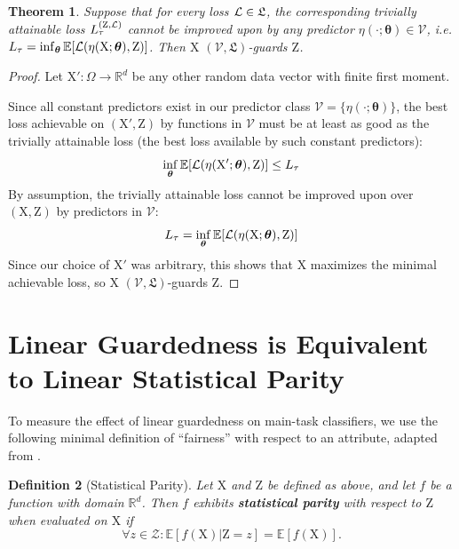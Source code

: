 \documentclass{article}
\theoremstyle{plain}
\newtheorem{theorem}{Theorem}[section]
\newtheorem{definition}[theorem]{Definition}
\theoremstyle{remark}
\newcommand{\vtheta}{{ \boldsymbol \theta}}
\newcommand{\E}{\mathbb E}
\newcommand{\Ltriv}{L_\tau}
\newcommand{\Ltrivfull}{L_\tau^{(\rv Z, \loss)}}
\theoremstyle{plain}
\theoremstyle{TheoremNum}
\newcommand{\rv}[1]{{\mathrm{#1}}}
\newcommand{\loss}{\color{black} \mathcal{L}}
\begin{document}
\begin{theorem}\label{thm:trivial-to-guarded}
    Suppose that for every loss $\loss \in \mathfrak L$, the corresponding trivially attainable loss $\Ltrivfull$ cannot be improved upon by any predictor $\eta(\cdot; \vtheta) \in \mathcal V$, i.e. $\Ltriv = \inf_\vtheta \E[\loss(\eta(\rv X; \vtheta), \rv Z)]$. Then $\rv X$ $(\mathcal V, \mathfrak L)$-guards $\rv Z$.
\end{theorem}

\begin{proof}
    \label{app:trivial-to-guarded}
    Let $\rv X': \Omega \to \mathbb R^d$ be any other random data vector with finite first moment.
    
    Since all constant predictors exist in our predictor class $\mathcal V = \{\eta(\cdot; \vtheta)\}$, the best loss achievable on $(\rv X', \rv Z)$ by functions in $\mathcal V$ must be at least as good as the trivially attainable loss (the best loss available by such constant predictors):
    \begin{equation*}
        \inf_\vtheta \E[\loss(\eta(\rv X'; \vtheta), \rv Z)]
        \le \Ltriv
    \end{equation*}
    By assumption, the trivially attainable loss cannot be improved upon over $(\rv X, \rv Z)$ by predictors in $\mathcal V$:
    \begin{equation*}
        \Ltriv
        = \inf_\vtheta \E[\loss(\eta(\rv X; \vtheta), \rv Z)]
    \end{equation*}
    Since our choice of $\rv X'$ was arbitrary, this shows that $\rv X$ maximizes the minimal achievable loss, so $\rv X$ $(\mathcal V, \mathfrak L)$-guards $\rv Z$.
\end{proof}

\section{Linear Guardedness is Equivalent to Linear Statistical Parity}\label{statistical-parity}

To measure the effect of linear guardedness on main-task classifiers, we use the following minimal definition of ``fairness'' with respect to an attribute, adapted from \citet{edwards2015censoring}.
\begin{definition}[Statistical Parity]\label{def:statistical-parity}
    Let $\rv X$ and $\rv Z$ be defined as above, and let $f$ be a function with domain $\mathbb R^d$. Then $f$ exhibits \textbf{statistical parity} with respect to $\rv Z$ when evaluated on $\rv X$ if
    \begin{equation*}
        \forall z \in \mathcal Z : \E[f(\rv X)|\rv Z = z] = \E[f(\rv X)].
    \end{equation*}
\end{definition}
\end{document}
